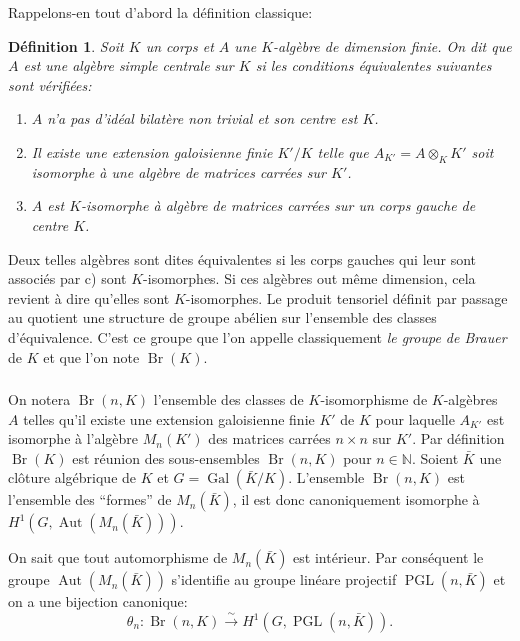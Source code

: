 \documentclass{article}
\DeclareMathOperator{\aut}{Aut}
\DeclareMathOperator{\br}{Br}
\DeclareMathOperator{\gal}{Gal}
\DeclareMathOperator{\pgl}{PGL}
\newcommand{\dN}{\mathbb{N}}
\newcommand{\iso}{\xrightarrow\sim}
\newtheorem{definition}[subsubsection]{Définition}
\begin{document}
Rappelons-en tout d'abord la définition classique:





\begin{definition}\label{3-1-1}
Soit $K$ un corps et $A$ une $K$-algèbre de dimension finie. On dit que $A$ 
est une algèbre simple centrale sur $K$ si les conditions équivalentes 
suivantes sont vérifiées:
\begin{enumerate}[\indent a)]
  \item $A$ n'a pas d'idéal bilatère non trivial et son centre est $K$. 
  \item Il existe une extension galoisienne finie $K'/K$ telle que 
    $A_{K'} = A\otimes_K K'$ soit isomorphe à une algèbre de matrices 
    carrées sur $K'$.
  \item $A$ est $K$-isomorphe à algèbre de matrices carrées sur un corps 
    gauche de centre $K$.
\end{enumerate}
\end{definition}

Deux telles algèbres sont dites équivalentes si les corps gauches qui 
leur sont associés par c) sont $K$-isomorphes. Si ces algèbres out 
même dimension, cela revient à dire qu'elles sont $K$-isomorphes. Le 
produit tensoriel définit par passage au quotient une structure de groupe 
abélien sur l'ensemble des classes d'équivalence. C'est ce groupe que l'on 
appelle classiquement \emph{le groupe de Brauer} de $K$ et que l'on note 
$\br(K)$. 





\subsubsection{}\label{3-1-2}

On notera $\br(n,K)$ l'ensemble des classes de $K$-isomorphisme de 
$K$-algèbres $A$ telles qu'il existe une extension galoisienne finie $K'$ de 
$K$ pour laquelle $A_{K'}$ est isomorphe à l'algèbre $M_n(K')$ des matrices 
carrées $n\times n$ sur $K'$. Par définition $\br(K)$ est réunion des 
sous-ensembles $\br(n,K)$ pour $n\in\dN$. Soient $\bar K$ une clôture 
algébrique de $K$ et $G=\gal(\bar K/K)$. L'ensemble $\br(n,K)$ est 
l'ensemble des ``formes'' de $M_n(\bar K)$, il est donc canoniquement 
isomorphe à $H^1\left(G,\aut(M_n(\bar K))\right)$. 

On sait que tout automorphisme de $M_n(\bar K)$ est intérieur. Par 
conséquent le groupe $\aut(M_n(\bar K))$ s'identifie au groupe linéare 
projectif $\pgl(n,\bar K)$ et on a une bijection canonique:
\[
  \theta_n : \br(n,K) \iso H^1\left(G,\pgl(n,\bar K)\right)\text{.}
\]
\end{document}
